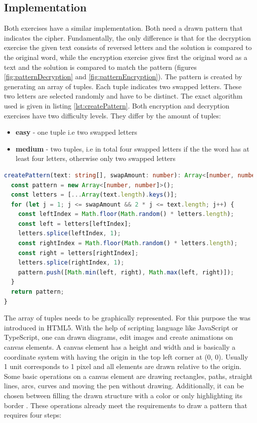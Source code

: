 \subsection{Implementation}

Both exercises have a similar implementation. Both need a drawn pattern that indicates the cipher. Fundamentally, the only difference is that for the decryption exercise the given text consists of reversed letters and the solution is compared to the original word, while the encryption exercise gives first the original word as a text and the solution is compared to match the pattern (figures \ref{fig:patternDecryption} and \ref{fig:patternEncryption}). 
The pattern is created by generating an array of tuples. Each tuple indicates two swapped letters. These two letters are selected randomly and have to be distinct. The exact algorithm used is given in listing \ref{lst:createPattern}.
Both encryption and decryption exercises have two difficulty levels. They differ by the amount of tuples:

\begin{itemize}
    \item \textbf{easy} - one tuple i.e two swapped letters 
    \item \textbf{medium} - two tuples, i.e in total four swapped letters if the the word has at least four letters, otherwise only two swapped letters 
\end{itemize}

\begin{lstlisting}[language=TypeScript,caption={Algorithm to generate an array of distinct tuples of given size},label={lst:createPattern}]
createPattern(text: string[], swapAmount: number): Array<[number, number]> {
  const pattern = new Array<[number, number]>();
  const letters = [...Array(text.length).keys()];
  for (let j = 1; j <= swapAmount && 2 * j <= text.length; j++) {
    const leftIndex = Math.floor(Math.random() * letters.length);
    const left = letters[leftIndex];
    letters.splice(leftIndex, 1);
    const rightIndex = Math.floor(Math.random() * letters.length);
    const right = letters[rightIndex];
    letters.splice(rightIndex, 1);
    pattern.push([Math.min(left, right), Math.max(left, right)]);
  }
  return pattern;
}
\end{lstlisting}

The array of tuples needs to be graphically represented. For this purpose the  was introduced in HTML5. With the help of scripting language like JavaScript or TypeScript, one can drawn diagrams, edit images and create animations on canvas elements. A canvas element has a height and width and is basically a coordinate system with having the origin in the top left corner at (0, 0). Usually 1 unit corresponds to 1 pixel and all elements are drawn relative to the origin. Some basic operations on a canvas element are drawing rectangles, paths, straight lines, arcs, curves and moving the pen without drawing. Additionally, it can be chosen between filling the drawn structure with a color or only highlighting its border \cite{MDNWebDocs}. These operations already meet the requirements to draw a pattern that requires four steps: 

